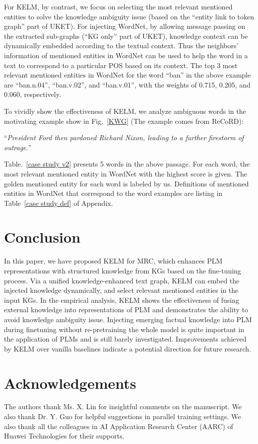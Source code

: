 \documentclass{article} \usepackage{iclr2022_conference,times}
\begin{document}
For KELM, by contrast, we focus on selecting the most relevant mentioned entities to solve the knowledge ambiguity issue (based on the ``entity link to token graph'' part of UKET). For injecting WordNet, by allowing message passing on the extracted sub-graphs (``KG only'' part of UKET), knowledge context can be dynamically embedded according to the textual context. Thus the neighbors' information of mentioned entities in WordNet can be used to help the word in a text to correspond to a particular POS based on its context. The top 3 most relevant mentioned entities in WordNet for the word ``ban'' in the above example are ``ban.n.04'', ``ban.v.02'', and ``ban.v.01'', with the weights of 0.715, 0.205, and 0.060, respectively.

To vividly show the effectiveness of KELM, we analyze ambiguous words in the motivating example show in Fig.~\ref{KWG} (The example comes from ReCoRD): 

``\textit{President Ford then pardoned Richard Nixon, leading to a further firestorm of outrage.}'' 

Table.~\ref{case study v2} presents 5 words in the above passage. For each word, the most relevant mentioned entity in WordNet with the highest score is given. The golden mentioned entity for each word is labeled by us.
Definitions of mentioned entities in WordNet that correspond to the word examples are listing in Table~\ref{case study def} of Appendix.


\section{Conclusion}

In this paper, we have proposed KELM for MRC, which enhances PLM representations with structured knowledge from KGs based on the fine-tuning process. Via a unified knowledge-enhanced text graph, KELM can embed the injected knowledge dynamically, and select relevant mentioned entities in the input KGs. In the empirical analysis, KELM shows the effectiveness of fusing external knowledge into representations of PLM and demonstrates the ability to avoid knowledge ambiguity issue. 
Injecting emerging factual knowledge into PLM during finetuning without re-pretraining the whole model is quite important in the application of PLMs and is still barely investigated. Improvements achieved by KELM over vanilla baselines indicate a potential direction for future research.

\section*{Acknowledgements}
The authors thank Ms. X. Lin for insightful comments on the manuscript. We also thank Dr. Y. Guo for helpful suggestions in parallel training settings. We also thank all the colleagues in AI Application Research Center (AARC) of Huawei Technologies for their supports.


\end{document}

